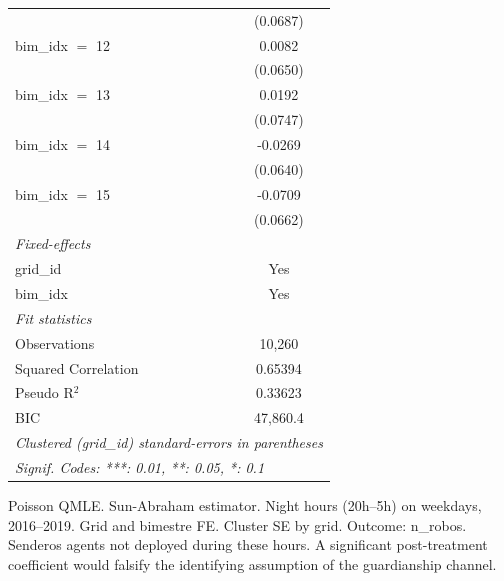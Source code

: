 \begin{tabular}{lc}
                       & (0.0687)\\   
   bim\_idx $=$ 12     & 0.0082\\   
                       & (0.0650)\\   
   bim\_idx $=$ 13     & 0.0192\\   
                       & (0.0747)\\   
   bim\_idx $=$ 14     & -0.0269\\   
                       & (0.0640)\\   
   bim\_idx $=$ 15     & -0.0709\\   
                       & (0.0662)\\   
   \midrule
   \emph{Fixed-effects}\\
   grid\_id            & Yes\\  
   bim\_idx            & Yes\\  
   \midrule
   \emph{Fit statistics}\\
   Observations        & 10,260\\  
   Squared Correlation & 0.65394\\  
   Pseudo R$^2$        & 0.33623\\  
   BIC                 & 47,860.4\\  
   \midrule \midrule
   \multicolumn{2}{l}{\emph{Clustered (grid\_id) standard-errors in parentheses}}\\
   \multicolumn{2}{l}{\emph{Signif. Codes: ***: 0.01, **: 0.05, *: 0.1}}\\
\end{tabular}
 
\par \raggedright 
Poisson QMLE. Sun-Abraham estimator. Night hours (20h--5h) on weekdays, 2016--2019. Grid and bimestre FE. Cluster SE by grid. Outcome: n\_robos. Senderos agents not deployed during these hours. A significant post-treatment coefficient would falsify the identifying assumption of the guardianship channel.
\par\endgroup


